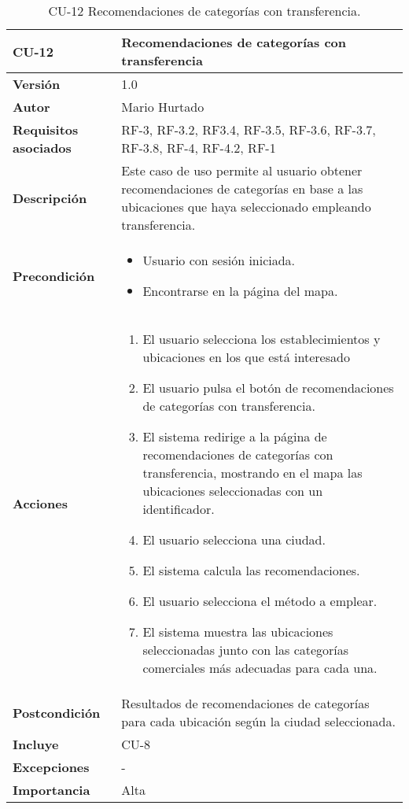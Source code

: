 \begin{table}[p]
	\centering
	\begin{tabularx}{\linewidth}{ p{} p{} }
		\toprule
		\textbf{CU-12}    & \textbf{Recomendaciones de categorías con transferencia}\\
		\toprule
		\textbf{Versión}              & 1.0    \\
		\textbf{Autor}                & Mario Hurtado \\
		\textbf{Requisitos asociados} & RF-3, RF-3.2, RF3.4, RF-3.5, RF-3.6, RF-3.7, RF-3.8, RF-4, RF-4.2, RF-1  \\
		\textbf{Descripción}          & Este caso de uso permite al usuario obtener recomendaciones de categorías en base a las ubicaciones que haya seleccionado empleando transferencia.\\
		\textbf{Precondición}         & \begin{itemize}
			\tightlist
			\item Usuario con sesión iniciada.
			\item Encontrarse en la página del mapa.
		\end{itemize}\\
		\textbf{Acciones}             &
		\begin{enumerate}
			\def\labelenumi{\arabic{enumi}.}
			\tightlist
			\item El usuario selecciona los establecimientos y ubicaciones en los que está interesado
			\item El usuario pulsa el botón de recomendaciones de categorías con transferencia.
			\item El sistema redirige a la página de recomendaciones de categorías con transferencia, mostrando en el mapa las ubicaciones seleccionadas con un identificador.
			\item El usuario selecciona una ciudad.
			\item El sistema calcula las recomendaciones.
			\item El usuario selecciona el método a emplear.
			\item El sistema muestra las ubicaciones seleccionadas junto con las categorías comerciales más adecuadas para cada una.
		\end{enumerate}\\
		\textbf{Postcondición}        & Resultados de recomendaciones de categorías para cada ubicación según la ciudad seleccionada.\\
		\textbf{Incluye}   & CU-8\\
		\textbf{Excepciones}          & - \\
		\textbf{Importancia}          & Alta  \\
		\bottomrule
	\end{tabularx}
	\caption{CU-12 Recomendaciones de categorías con transferencia.}
\end{table}